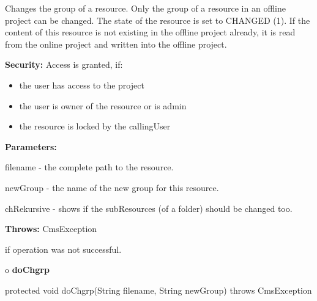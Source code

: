 \begin{description}
\htmlDD Changes the group of a resource. \htmlBR
Only the group of a resource in an offline project can be changed. The state
of the resource is set to CHANGED (1). If the content of this resource is not
existing in the offline project already, it is read from the online project
and written into the offline project.

{\bf Security:} Access is granted, if:

\begin{itemize}
\item the user has access to the project
\item the user is owner of the resource or is admin
\item the resource is locked by the callingUser
\end{itemize}

\begin{description}
\item {\bf Parameters:}

filename - the complete path to the resource.

newGroup - the name of the new group for this resource.

chRekursive - shows if the subResources (of a folder) should be changed too.
\item {\bf Throws:} CmsException

if operation was not successful.
\end{description}

\end{description}

o {\bf doChgrp}

\begin{PRE}
 protected void doChgrp(String filename,
                        String newGroup) throws CmsException
\end{PRE}

